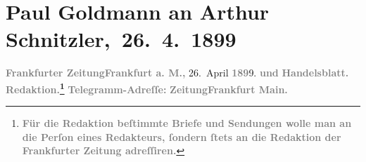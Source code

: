 

         
         \renewcommand{\erwaehntePersonen}{Personen: Julius Bauer, Alfred Dreyfus, Paul Goldmann, Karl Kraus}
         \renewcommand{\erwaehnteInstitutionen}{Institutionen: Deutsches Theater Berlin, Frankfurter Zeitung}
         \renewcommand{\erwaehnteOrte}{Orte: Berlin, Frankfurt am Main}
         \renewcommand{\erwaehnteWerke}{Werke: Der grüne Kakadu – Paracelsus – Die Gefährtin. Drei Einakter, Die Fackel, Die Vertreibung aus dem Paradiese}
               \section[ Paul Goldmann an Arthur Schnitzler, 26. 4. 1899]{ Paul Goldmann an Arthur Schnitzler, 26. 4. 1899}\nopagebreak{}\rehead{ }\begin{ledgroupsized}[t]{13cm}\normalsize\beginnumbering{} \toendnotes[C]{\smallbreak\pagebreak[2]} 
\toendnotes[C]{\smallbreak}\pstart
           \noindent{}{\pb}\textcolor{gray}{\textbf{\textbf{Frankfurter Zeitung}}}\hfill \textcolor{gray}{\textbf{\textbf{Frankfurt a. M.,}}}{ }26. April \textcolor{gray}{\textbf{189}}9.\pend
           \pstart
           \textcolor{gray}{\textbf{und}}\pend
           \pstart
           \textcolor{gray}{\textbf{Handelsblatt.}}\pend
           \pstart
           \textcolor{gray}{\textbf{\textbf{Redaktion.}\footnote{\noindent{}\textcolor{gray}{\textbf{Für die Redaktion beſtimmte Briefe und Sendungen wolle man
                                  an die Perſon eines Redakteurs,
                              ſondern ſtets \textbf{an die Redaktion der Frankfurter Zeitung} adreſſiren.}}}}}\pend
           \pstart
           \textcolor{gray}{\textbf{Telegramm-Adreſſe:}}\pend
           \pstart
           \textcolor{gray}{\textbf{\textbf{ZeitungFrankfurt Main.}}}\pend

\end{ledgroupsized}
